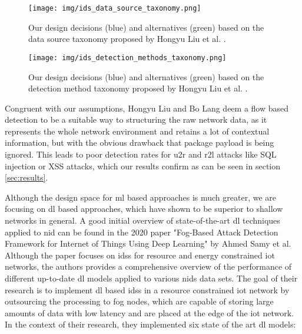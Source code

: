 \begin{figure}[H]
	\centering
	\texttt{[image: img/ids\_data\_source\_taxonomy.png]}
	\caption{Our design decisions (blue) and alternatives (green) based on the data source taxonomy proposed by Hongyu Liu et al. \cite{nid_ml_survey_2019}.}
	\label{fig:stateofart:ids_data_source_taxonomy}
\end{figure}


\begin{figure}[H]
	\centering
	\texttt{[image: img/ids\_detection\_methods\_taxonomy.png]}
	\caption{Our design decisions (blue) and alternatives (green) based on the detection method taxonomy proposed by Hongyu Liu et al. \cite{nid_ml_survey_2019}.}
	\label{fig:stateofart:ids_detection_methods_taxonomy}
\end{figure}

Congruent with our assumptions, Hongyu Liu and Bo Lang deem a flow based detection to be a suitable way to structuring the raw network data, as it represents the whole network environment and retains a lot of contextual information, but with the obvious drawback that package payload is being ignored. This leads to poor detection rates for \gls{u2r} and \gls{r2l} attacks like SQL injection or XSS attacks, which our results confirm as can be seen in section \ref{sec:results}. \par

Although the design space for \gls{ml} based approaches is much greater, we are focusing on \gls{dl} based approaches, which have shown to be superior to shallow networks in general. A good initial overview of state-of-the-art \gls{dl} techniques applied to \gls{nid} can be found in the 2020 paper "Fog-Based Attack Detection Framework for Internet of Things Using Deep Learning" \cite{fog_based_detection_survey_2020} by Ahmed Samy et al. Although the paper focuses on \glspl{ids} for resource and energy constrained \gls{iot} networks, the authors provides a comprehensive overview of the performance of different up-to-date \gls{dl} models applied to various \gls{nids} data sets. The goal of their research is to implement \gls{dl} based \glspl{ids} in a resource constrained \gls{iot} network by outsourcing the processing to fog nodes, which are capable of storing large amounts of data with low latency and are placed at the edge of the \gls{iot} network. In the context of their research, they implemented six state of the art \gls{dl} models:


